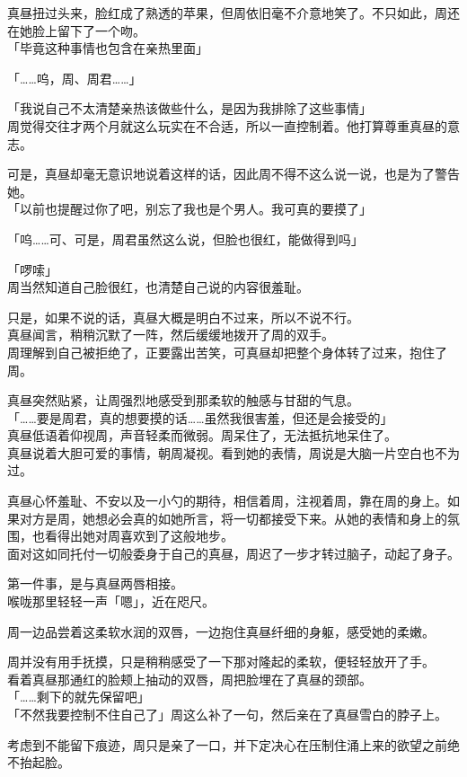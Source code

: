 真昼扭过头来，脸红成了熟透的苹果，但周依旧毫不介意地笑了。不只如此，周还在她脸上留下了一个吻。\\

「毕竟这种事情也包含在亲热里面」

「……呜，周、周君……」

「我说自己不太清楚亲热该做些什么，是因为我排除了这些事情」\\

周觉得交往才两个月就这么玩实在不合适，所以一直控制着。他打算尊重真昼的意志。

可是，真昼却毫无意识地说着这样的话，因此周不得不这么说一说，也是为了警告她。\\

「以前也提醒过你了吧，别忘了我也是个男人。我可真的要摸了」

「呜……可、可是，周君虽然这么说，但脸也很红，能做得到吗」

「啰嗦」\\

周当然知道自己脸很红，也清楚自己说的内容很羞耻。

只是，如果不说的话，真昼大概是明白不过来，所以不说不行。\\

真昼闻言，稍稍沉默了一阵，然后缓缓地拨开了周的双手。\\

周理解到自己被拒绝了，正要露出苦笑，可真昼却把整个身体转了过来，抱住了周。

真昼突然贴紧，让周强烈地感受到那柔软的触感与甘甜的气息。\\

「……要是周君，真的想要摸的话……虽然我很害羞，但还是会接受的」\\

真昼低语着仰视周，声音轻柔而微弱。周呆住了，无法抵抗地呆住了。\\

真昼说着大胆可爱的事情，朝周凝视。看到她的表情，周说是大脑一片空白也不为过。

真昼心怀羞耻、不安以及一小勺的期待，相信着周，注视着周，靠在周的身上。如果对方是周，她想必会真的如她所言，将一切都接受下来。从她的表情和身上的氛围，也看得出她对周喜欢到了这般地步。\\

面对这如同托付一切般委身于自己的真昼，周迟了一步才转过脑子，动起了身子。

第一件事，是与真昼两唇相接。\\

喉咙那里轻轻一声「嗯」，近在咫尺。

周一边品尝着这柔软水润的双唇，一边抱住真昼纤细的身躯，感受她的柔嫩。

周并没有用手抚摸，只是稍稍感受了一下那对隆起的柔软，便轻轻放开了手。\\

看着真昼那通红的脸颊上抽动的双唇，周把脸埋在了真昼的颈部。\\

「……剩下的就先保留吧」\\

「不然我要控制不住自己了」周这么补了一句，然后亲在了真昼雪白的脖子上。

考虑到不能留下痕迹，周只是亲了一口，并下定决心在压制住涌上来的欲望之前绝不抬起脸。
